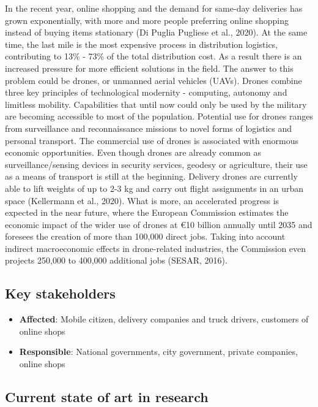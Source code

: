 \documentclass[
]{book}
\providecommand{\tightlist}{%
  \setlength{\itemsep}{0pt}\setlength{\parskip}{0pt}}
\begin{document}
In the recent year, online shopping and the demand for same-day deliveries has grown exponentially, with more and more people preferring online shopping instead of buying items stationary (Di Puglia Pugliese et al., 2020). At the same time, the last mile is the most expensive process in distribution logistics, contributing to 13\% - 73\% of the total distribution cost. As a result there is an increased pressure for more efficient solutions in the field. The answer to this problem could be drones, or unmanned aerial vehicles (UAVs). Drones combine three key principles of technological modernity - computing, autonomy and limitless mobility. Capabilities that until now could only be used by the military are becoming accessible to most of the population. Potential use for drones ranges from surveillance and reconnaissance missions to novel forms of logistics and personal transport. The commercial use of drones is associated with enormous economic opportunities. Even though drones are already common as surveillance/sensing devices in security services, geodesy or agriculture, their use as a means of transport is still at the beginning. Delivery drones are currently able to lift weights of up to 2-3 kg and carry out flight assignments in an urban space (Kellermann et al., 2020).
What is more, an accelerated progress is expected in the near future, where the European Commission estimates the economic impact of the wider use of drones at €10 billion annually until 2035 and foresees the creation of more than 100,000 direct jobs. Taking into account indirect macroeconomic effects in drone-related industries, the Commission even projects 250,000 to 400,000 additional jobs (SESAR, 2016).

\hypertarget{key-stakeholders-33}{%
\subsection*{Key stakeholders}\label{key-stakeholders-33}}

\begin{itemize}
\tightlist
\item
  \textbf{Affected}: Mobile citizen, delivery companies and truck drivers, customers of online shops
\item
  \textbf{Responsible}: National governments, city government, private companies, online shops
\end{itemize}

\hypertarget{current-state-of-art-in-research-33}{%
\subsection*{Current state of art in research}\label{current-state-of-art-in-research-33}}
\end{document}
